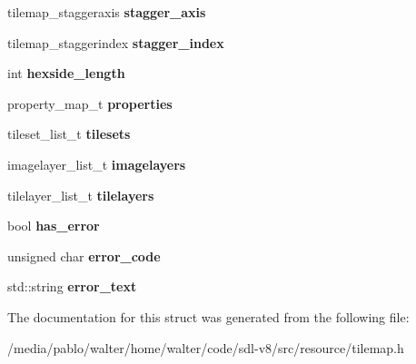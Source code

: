 \begin{DoxyCompactItemize}
\mbox{\label{structtilemap__data_a76d261c00413980f796ab2ea227bd9ae}} 
tilemap\+\_\+staggeraxis {\bfseries stagger\+\_\+axis}
\item 
\mbox{\label{structtilemap__data_a52bbf040853f03734bbfac728796673e}} 
tilemap\+\_\+staggerindex {\bfseries stagger\+\_\+index}
\item 
\mbox{\label{structtilemap__data_aa5e404c6e7ae69d76f50d111244d2b7d}} 
int {\bfseries hexside\+\_\+length}
\item 
\mbox{\label{structtilemap__data_ae5a51873ad20740e99f38891bc4cee59}} 
property\+\_\+map\+\_\+t {\bfseries properties}
\item 
\mbox{\label{structtilemap__data_afc4209027346632e45c1a69ad77d58d7}} 
tileset\+\_\+list\+\_\+t {\bfseries tilesets}
\item 
\mbox{\label{structtilemap__data_ad27569b6fb87ab3eb1b73c38af757c92}} 
imagelayer\+\_\+list\+\_\+t {\bfseries imagelayers}
\item 
\mbox{\label{structtilemap__data_aa9c2f1b9adda77cd669285f1f8da249c}} 
tilelayer\+\_\+list\+\_\+t {\bfseries tilelayers}
\item 
\mbox{\label{structtilemap__data_add7d9f9459132e5d5fc203d5c45d1da2}} 
bool {\bfseries has\+\_\+error}
\item 
\mbox{\label{structtilemap__data_adde88c85321e615685d758605f3cd133}} 
unsigned char {\bfseries error\+\_\+code}
\item 
\mbox{\label{structtilemap__data_a71be2dd5fb53ec9ebccaa2270611f056}} 
std\+::string {\bfseries error\+\_\+text}
\end{DoxyCompactItemize}


The documentation for this struct was generated from the following file\+:\begin{DoxyCompactItemize}
\item 
/media/pablo/walter/home/walter/code/sdl-\/v8/src/resource/tilemap.\+h\end{DoxyCompactItemize}
